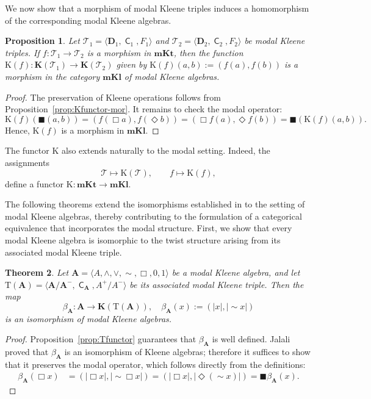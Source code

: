 \documentclass{article}
\newtheorem{theorem}{Theorem}[section]
\newtheorem{proposition}[theorem]{Proposition}
\DeclareMathOperator{\con}{\mathsf{C}}
\newcommand{\A}{\mathbf{A}}
\newcommand{\D}{\mathbf{D}}
\newcommand{\T}{\mathcal{T}}
\newcommand{\boxn}{\blacksquare}
\begin{document}
We now show that a morphism of modal Kleene triples induces a homomorphism of the corresponding modal Kleene algebras.

\begin{proposition}\label{morfismo mkt}
    Let $\T_1=\langle \D_1, \con_1, F_1 \rangle$ and $\T_2=\langle \D_2, \con_2, F_2 \rangle$ be modal Kleene triples. If $f: \T_1 \rightarrow \T_2$ is a morphism in $\mathbf{mKt}$, then the function $\mathrm{K}(f): \mathbf{K}(\T_1) \rightarrow \mathbf{K}(\T_2)$ given by $\mathrm{K}(f)(a,b) := (f(a), f(b))$ is a morphism in the category $\mathbf{mKl}$ of modal Kleene algebras.
\end{proposition}
\begin{proof}    
    The preservation of Kleene operations follows from Proposition~\ref{prop:Kfunctor-mor}. It remains to check the modal operator:
    \[
        \mathrm{K}(f)(\boxn(a,b)) = (f(\Box a), f(\Diamond b)) = (\Box f(a), \Diamond f(b)) = \boxn(\mathrm{K}(f)(a,b)).
    \]
    Hence, $\mathrm{K}(f)$ is a morphism in $\mathbf{mKl}$.
\end{proof}

The functor $\mathrm{K}$ also extends naturally to the modal setting. Indeed, the assignments
\[ \mathcal{T}\mapsto\mathrm{K}(\mathcal{T}),\qquad f\mapsto\mathrm{K}(f), \] 
define a functor $\mathrm{K}\colon\mathbf{mKt}\to\mathbf{mKl}$.

The following theorems extend the isomorphisms established in \cite{jalali} to the setting of modal Kleene algebras, thereby contributing to the formulation of a categorical equivalence that incorporates the modal structure. First, we show that every modal Kleene algebra is isomorphic to the twist structure arising from its associated modal Kleene triple.

\begin{theorem}
\label{thm:beta-iso}
    Let $\A = \langle A, \wedge, \vee, \sim, \Box, 0, 1 \rangle$ be a modal Kleene algebra, and let $\mathrm{T}(\A)=\langle\A/\A^{-}, \con_{\A},A^{+}  / A^{-} \rangle$ be its associated modal Kleene triple. Then the map
    \[
        \beta_\A \colon \A \to \mathbf{K}(\mathrm{T}(\A)), \quad \beta_\A(x) := (|x|, |\sim x|)
    \]
    is an isomorphism of modal Kleene algebras.
\end{theorem}
\begin{proof}
    Proposition~\ref{prop:Tfunctor} guarantees that $\beta_\A$ is well defined.  Jalali \cite{jalali} proved that $\beta_\A$ is an isomorphism of Kleene algebras; therefore it suffices to show that it preserves the modal operator, which follows directly from the definitions:
    \begin{align*}
        \beta_\A(\Box x) &= (|\Box x|, |\sim \Box x|) = (|\Box x|, |\Diamond (\sim x)|) = \boxn  \beta_\A(x).
    \end{align*}  
\end{proof}
\end{document}
